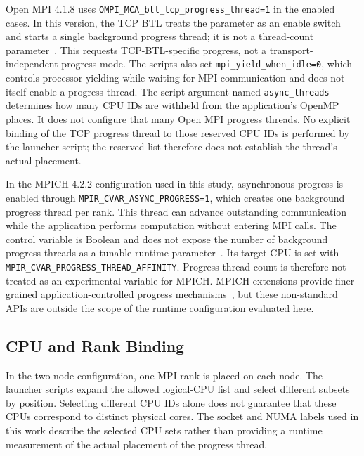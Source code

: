 Open MPI 4.1.8 uses
\texttt{OMPI\_MCA\_}\allowbreak\texttt{btl\_tcp\_}\allowbreak\texttt{progress\_thread=1}
in the enabled cases. In this version, the TCP BTL treats the parameter as
an enable switch and starts a single background progress thread; it is not
a thread-count parameter~\cite{openmpi418TcpProgress}.
This requests TCP-BTL-specific progress, not a transport-independent progress
mode. The scripts also set \texttt{mpi\_yield\_when\_idle=0},
which controls processor yielding while waiting for MPI communication
and does not itself enable a progress thread. The script argument
named \texttt{async\_threads} determines how many CPU IDs are withheld from
the application's OpenMP places. It does not configure that many Open MPI
progress threads. No explicit binding of the TCP progress thread to those
reserved CPU IDs is performed by the launcher script; the reserved list
therefore does not establish the thread's actual placement.

In the MPICH 4.2.2 configuration used in this study, asynchronous progress
is enabled through
\texttt{MPIR\_CVAR\_}\allowbreak\texttt{ASYNC\_PROGRESS=1}, which creates one
background progress thread per rank. This thread can advance outstanding
communication while the application performs computation without entering
MPI calls. The control variable is Boolean and does not expose the number
of background progress threads as a tunable runtime
parameter~\cite{mpichAsyncProgressControl}. Its target CPU is set with
\texttt{MPIR\_CVAR\_}\allowbreak\texttt{PROGRESS\_}\allowbreak\texttt{THREAD\_}\allowbreak\texttt{AFFINITY}.
Progress-thread count is therefore not treated as an experimental variable
for MPICH. MPICH extensions provide finer-grained
application-controlled progress
mechanisms~\cite{zhou2024mpichExtensions,zhou2024mpiProgressForAll}, but these
non-standard APIs are outside the scope of the runtime configuration
evaluated here.

\subsection{CPU and Rank Binding}

In the two-node configuration, one MPI rank is placed on each node. The launcher scripts expand the allowed logical-CPU list and select different subsets by position. Selecting different CPU IDs alone does not guarantee that these CPUs correspond to distinct physical cores. The socket and NUMA labels used in this work describe the selected CPU sets rather than providing a runtime measurement of the actual placement of the progress thread.

